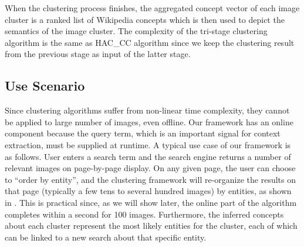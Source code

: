 When the clustering process finishes, the aggregated concept vector of each image cluster is
a ranked list of Wikipedia concepts which is then used to depict the semantics of
the image cluster. The complexity of the tri-stage clustering algorithm is the same as
HAC\_CC algorithm since we keep the clustering result from the previous stage as input of the
latter stage.

\subsection{Use Scenario}
Since clustering algorithms suffer from non-linear time complexity, 
they cannot be applied to large number of images, even offline.
Our framework has an online component because the query term, which is
an important signal for context extraction, must be supplied
at runtime. A typical use case of our framework is as follows. 
User enters a search term
and the search engine returns a number of relevant images on
page-by-page display. On any given page, the user can choose to 
``order by entity'', and the clustering framework will re-organize 
the results on that page (typically a few tens to several hundred images)
by entities, as shown in . This is practical
since, as we will show later, the online part of the algorithm completes
within a second for 100 images. Furthermore, the
inferred concepts about each cluster represent
the most likely entities for the cluster, each of which can be 
linked to a new search about that specific entity.

